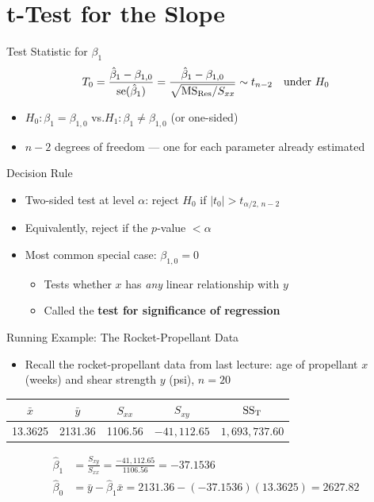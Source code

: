 \section{t-Test for the Slope}


\begin{frame}{Test Statistic for $\beta_1$}
	\[
		T_0 = \frac{\hat\beta_1-\beta_{1,0}}{\operatorname{se}(\hat\beta_1)} = \frac{\hat\beta_1-\beta_{1,0}}{\sqrt{\mathrm{MS}_{\mathrm{Res}}/S_{xx}}} \sim t_{n-2} \quad\text{under } H_0
	\]
	\begin{itemize}
		\item $H_0:\beta_1=\beta_{1,0}$ \quad vs.\quad $H_1:\beta_1\neq\beta_{1,0}$ (or one-sided)
		\item $n-2$ degrees of freedom --- one for each parameter already estimated
	\end{itemize}
\end{frame}


\begin{frame}{Decision Rule}
	\begin{itemize}
		\item Two-sided test at level $\alpha$: reject $H_0$ if $|t_0|>t_{\alpha/2,\,n-2}$
		\item Equivalently, reject if the $p$-value $<\alpha$
		\item Most common special case: $\beta_{1,0}=0$
		\begin{itemize}
			\item Tests whether $x$ has \emph{any} linear relationship with $y$
			\item Called the \textbf{test for significance of regression}
		\end{itemize}
	\end{itemize}
\end{frame}


\begin{frame}{Running Example: The Rocket-Propellant Data}
	\begin{itemize}
		\item Recall the rocket-propellant data from last lecture: age of propellant $x$ (weeks) and shear strength $y$ (psi), $n=20$
	\end{itemize}

	\begin{table}
		\small
		\centering
		\begin{tabular}{ccccc}
			\toprule
			$\bar x$ & $\bar y$ & $S_{xx}$ & $S_{xy}$ & $\mathrm{SS}_{\mathrm{T}}$\\
			\midrule
			13.3625 & 2131.36 & 1106.56 & $-41{,}112.65$ & $1{,}693{,}737.60$\\
			\bottomrule
		\end{tabular}
	\end{table}

	\begin{align*}
		\hat\beta_1 &= \frac{S_{xy}}{S_{xx}} = \frac{-41{,}112.65}{1106.56} = -37.1536\\
		\hat\beta_0 &= \bar y-\hat\beta_1\bar x = 2131.36-(-37.1536)(13.3625) = 2627.82
	\end{align*}
\end{frame}


